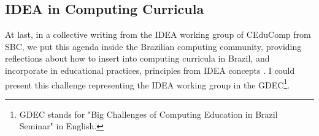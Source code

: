 \subsection{IDEA in Computing Curricula}

At last, in a collective writing from the \acrfull{IDEA} working group of \acrfull{CEduComp} from \acrfull{SBC}, we put this agenda inside the Brazilian computing community, providing reflections about how to insert into computing curricula in Brazil, and incorporate in educational practices, principles from \acrshort{IDEA} concepts \cite{bispojr:2024-gdec}. I could present this challenge representing the \acrshort{IDEA} working group in the \acrfull{GDEC}\footnote{GDEC stands for "Big Challenges of Computing Education in Brazil Seminar" in English.}.



